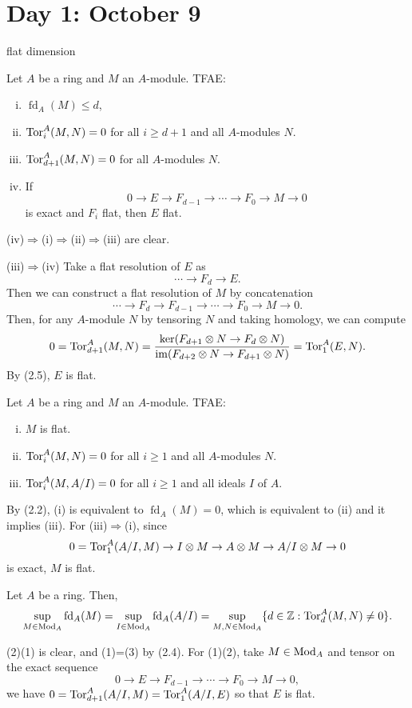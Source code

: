 \documentclass{../../../small}
\renewcommand{\fd}{\operatorname{fd}}
\begin{document}
\newpage
\section{Day 1: October 9}

flat dimension

\begin{prop*}[2.4]
Let $A$ be a ring and $M$ an $A$-module.
TFAE:
\begin{enumerate}[(i)]
\item $\fd_A(M)\le d$,
\item $\operatorname{Tor}_i^A(M,N)=0$ for all $i\ge d+1$ and all $A$-modules $N$.
\item $\operatorname{Tor}_{d+1}^A(M,N)=0$ for all $A$-modules $N$.
\item If
\[0\to E\to F_{d-1}\to\cdots\to F_0\to M\to0\]
is exact and $F_i$ flat, then $E$ flat.
\end{enumerate}
\end{prop*}
\begin{pf}
(iv)$\Rightarrow$(i)$\Rightarrow$(ii)$\Rightarrow$(iii) are clear.

(iii)$\Rightarrow$(iv)
Take a flat resolution of $E$ as
\[\cdots\to F_d\to E.\]
Then we can construct a flat resolution of $M$ by concatenation
\[\cdots\to F_d\to F_{d-1}\to\cdots\to F_0\to M\to0.\]
Then, for any $A$-module $N$ by tensoring $N$ and taking homology, we can compute
\[0=\operatorname{Tor}_{d+1}^A(M,N)=\frac{\ker(F_{d+1}\otimes N\to F_d\otimes N)}{\operatorname{im}(F_{d+2}\otimes N\to F_{d+1}\otimes N)}=\operatorname{Tor}_1^A(E,N).\]
By (2.5), $E$ is flat.
\end{pf}

\begin{lem*}[2.5]
Let $A$ be a ring and $M$ an $A$-module.
TFAE:
\begin{enumerate}[(i)]
\item $M$ is flat.
\item $\operatorname{Tor}_i^A(M,N)=0$ for all $i\ge1$ and all $A$-modules $N$.
\item $\operatorname{Tor}_i^A(M,A/I)=0$ for all $i\ge1$ and all ideals $I$ of $A$.
\end{enumerate}
\end{lem*}
\begin{pf}
By (2.2), (i) is equivalent to $\fd_A(M)=0$, which is equivalent to (ii) and it implies (iii).
For (iii)$\Rightarrow$(i), since
\[0=\operatorname{Tor}_1^A(A/I,M)\to I\otimes M\to A\otimes M\to A/I\otimes M\to0\]
is exact, $M$ is flat.
\end{pf}


\begin{prop*}[2.6]
Let $A$ be a ring.
Then,
\[\sup_{M\in\Mod_A}\fd_A(M)=\sup_{I\in\Mod_A}\fd_A(A/I)=\sup_{M,N\in\Mod_A}\{d\in\Z:\Tor_d^A(M,N)\ne0\}.\]
\end{prop*}
\begin{pf}
(2)\le(1) is clear, and (1)=(3) by (2.4).
For (1)\le(2), take $M\in\operatorname{Mod}_A$ and tensor on the exact sequence
\[0\to E\to F_{d-1}\to\cdots\to F_0\to M\to0,\]
we have $0=\operatorname{Tor}_{d+1}^A(A/I,M)=\operatorname{Tor}_1^A(A/I,E)$ so that $E$ is flat.
\end{pf}
\end{document}
